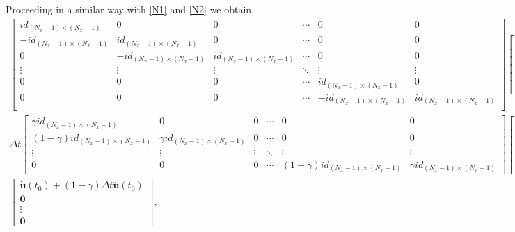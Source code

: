 \documentclass[a4paper, 10pt]{article}
\begin{document}
Proceeding in a similar way with \eqref{N1} and \eqref{N2} we obtain
\begin{align*}
\left[
\begin{array}{ccccccc}
id_{(N_x-1)\times(N_x-1)}& 0 & 0  &\cdots & 0 & 0 \\
 -id_{(N_x-1)\times(N_x-1)} & id_{(N_x-1)\times(N_x-1)} & 0 & \cdots & 0 & 0 \\
0 & -id_{(N_x-1)\times(N_x-1)} & id_{(N_x-1)\times(N_x-1)} & \cdots & 0 & 0 \\
\vdots & \vdots & \vdots & \ddots & \vdots & \vdots \\
0 & 0 & 0 & \cdots & id_{(N_x-1)\times(N_x-1)}  & 0 \\
0 & 0 & 0 & \cdots & -id_{(N_x-1)\times(N_x-1)} &  id_{(N_x-1)\times(N_x-1)} \\
\end{array}
\right]\left[
\begin{array}{c}
\dot{\mathbf{u}}(t_1)\\
\dot{\mathbf{u}}(t_2) \\
\vdots \\
\dot{\mathbf{u}}(t_{N_t}) 
\end{array}
\right] -
\end{align*}
\begin{align*}
\Delta t\left[
\begin{array}{cccccc}
 \gamma id_{(N_x-1)\times(N_x-1)} & 0 & 0  &\cdots & 0 & 0 \\
 \left(1-\gamma\right)id_{(N_x-1)\times(N_x-1)} & \gamma id_{(N_x-1)\times(N_x-1)} & 0 &  \cdots & 0 & 0  \\
\vdots & \vdots & \vdots & \ddots & \vdots & \vdots  \\
0 & 0 & 0 &\cdots & \left(1-\gamma\right)id_{(N_x-1)\times(N_x-1)} & \gamma id_{(N_x-1)\times(N_x-1)}
\end{array}
\right]\left[
\begin{array}{c}
\ddot{\mathbf{u}}(t_1)\\
\ddot{\mathbf{u}}(t_2) \\
\vdots \\
\ddot{\mathbf{u}}(t_{N_t}) 
\end{array}
\right] = \\
\left[
\begin{array}{c}
\dot{\mathbf{u}}(t_0) + \left(1-\gamma\right)\Delta t\ddot{\mathbf{u}}(t_0) \\
\mathbf{0} \\
\vdots \\
\mathbf{0} 
\end{array}
\right],
\end{align*}
\end{document}
